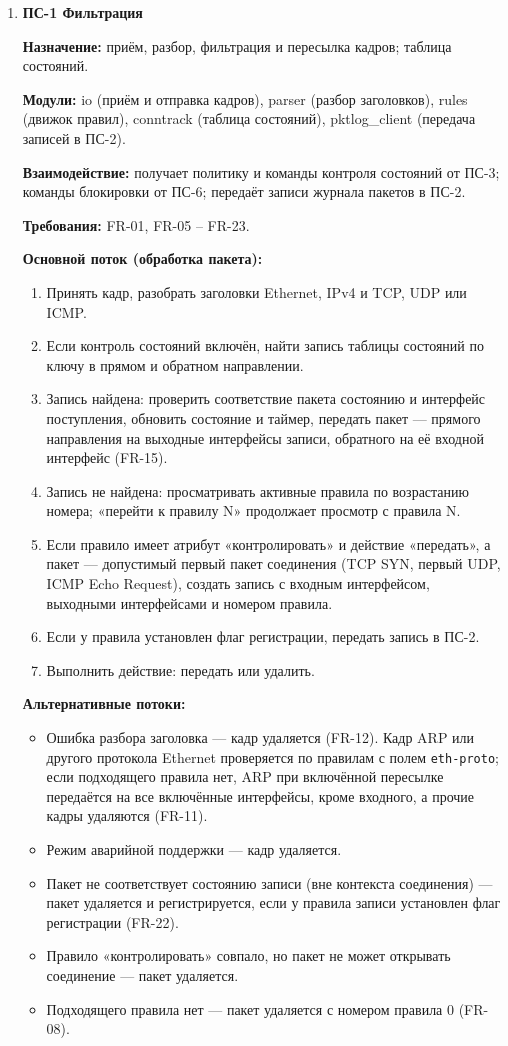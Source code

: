 \documentclass[13pt,a4paper,final]{article}
\begin{document}
	\begin{enumerate}
		\item 	\textbf{ПС-1 Фильтрация}
		
		\textbf{Назначение:} приём, разбор, фильтрация и пересылка кадров; таблица состояний.
		
		\textbf{Модули:} io (приём и отправка кадров), parser (разбор заголовков), rules (движок правил), conntrack (таблица состояний), pktlog\_client (передача записей в ПС-2).
		
		\textbf{Взаимодействие:} получает политику и команды контроля состояний от ПС-3; команды блокировки от ПС-6; передаёт записи журнала пакетов в ПС-2.
		
		\textbf{Требования:} FR-01, FR-05 – FR-23.
		
		\textbf{Основной поток (обработка пакета):}
		\begin{enumerate}
			\item Принять кадр, разобрать заголовки Ethernet, IPv4 и TCP, UDP или ICMP.
			\item Если контроль состояний включён, найти запись таблицы состояний по ключу в прямом и обратном направлении.
			\item Запись найдена: проверить соответствие пакета состоянию и интерфейс поступления, обновить состояние и таймер, передать пакет — прямого направления на выходные интерфейсы записи, обратного на её входной интерфейс (FR-15).
			\item Запись не найдена: просматривать активные правила по возрастанию номера; «перейти к правилу N» продолжает просмотр с правила N.
			\item Если правило имеет атрибут «контролировать» и действие «передать», а пакет — допустимый первый пакет соединения (TCP SYN, первый UDP, ICMP Echo Request), создать запись с входным интерфейсом, выходными интерфейсами и номером правила.
			\item Если у правила установлен флаг регистрации, передать запись в ПС-2.
			\item Выполнить действие: передать или удалить.
		\end{enumerate}
		
		\textbf{Альтернативные потоки:}
		\begin{itemize}
			\item Ошибка разбора заголовка — кадр удаляется (FR-12). Кадр ARP или другого протокола Ethernet проверяется по правилам с полем \texttt{eth-proto}; если подходящего правила нет, ARP при включённой пересылке передаётся на все включённые интерфейсы, кроме входного, а прочие кадры удаляются (FR-11).
			\item Режим аварийной поддержки — кадр удаляется.
			\item Пакет не соответствует состоянию записи (вне контекста соединения) — пакет удаляется и регистрируется, если у правила записи установлен флаг регистрации (FR-22).
			\item Правило «контролировать» совпало, но пакет не может открывать соединение — пакет удаляется.
			\item Подходящего правила нет — пакет удаляется с номером правила 0 (FR-08).
		\end{itemize}
		

\end{enumerate}
\end{document}
